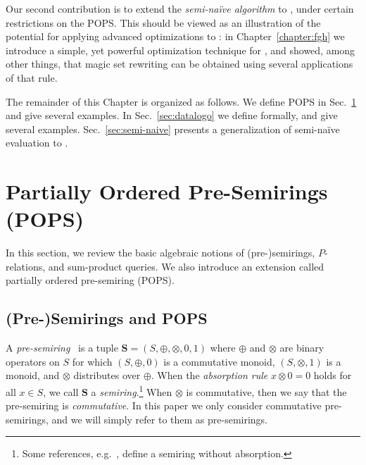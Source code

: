 
Our second contribution is to extend the {\em semi-na\"ive algorithm} 
to \datalogo, under certain restrictions on the POPS.  This
should be viewed as an illustration of the potential for applying
advanced optimizations to \datalogo: in Chapter~\ref{chapter:fgh}
we introduce a simple, yet
powerful optimization technique for \datalogo, and showed, among other
things, that magic set rewriting can be obtained using several
applications of that rule.

The remainder of this Chapter is organized as follows. 
We define POPS in Sec.~\ref{sec:pops} and give several examples.
In Sec.~\ref{sec:datalogo} we define \datalogo formally, 
 and give several examples.
Sec.~\ref{sec:semi-naive} presents a generalization of semi-na\"ive
evaluation to \datalogo.  

\section{Partially Ordered Pre-Semirings (POPS)}
\label{sec:pops}

In this section, we review the basic algebraic notions of (pre-)semirings,
$P$-relations, and sum-product queries.
We also introduce an extension called partially ordered pre-semiring (POPS).

\subsection{(Pre-)Semirings and POPS}

\begin{defn}
A {\em pre-semiring}~\cite{semiring_book} is a tuple
$\bm S = (S, \oplus, \otimes, 0, 1)$ where $\oplus$ and $\otimes$ are
binary operators on $S$ for which $(S, \oplus, 0)$ is a commutative
monoid, $(S, \otimes, 1)$ is a monoid, and $\otimes$ distributes over
$\oplus$.
When the {\em absorption rule} $x \otimes 0 = 0$ holds
for all $x \in S$, we call $\bm S$ a {\em semiring}.\footnote{Some
  references, e.g.~\cite{DBLP:journals/ai/KohlasW08}, define a
  semiring without absorption.}
%
When $\otimes$ is commutative, then we say that the
pre-semiring is {\em commutative}.  In this paper we only consider
commutative pre-semirings, and we will simply refer to them as
pre-semirings.
\end{defn}

